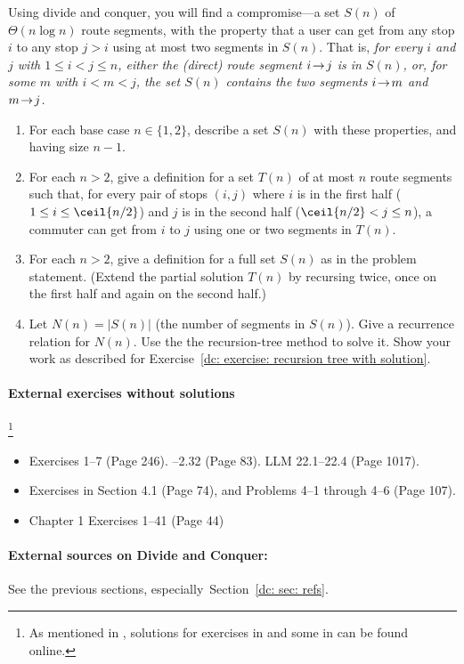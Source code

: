Using divide and conquer, you will find a compromise---a set $S(n)$ of $\Theta(n \log n)$ route segments, with the property that a user can get from any stop $i$ to any stop $j > i$ using at most two segments in $S(n)$.
That is, \emph{for every $i$ and $j$ with $1\le i< j\le n$, either the (direct) route segment $i\!\to\! j$ is in $S(n)$,
or, for some $m$ with $i<m<j$, the set $S(n)$ contains the two segments $i\!\to\! m$ and  $m\!\to\! j$.}

\begin{enumerate}[label=(\alph*)]
\item For each base case $n\in\{1,2\}$, describe a set $S(n)$ with these properties, and having size $n-1$.

\item For each $n>2$,
  give a definition for a set $T(n)$ of at most $n$ route segments such that,
  for every pair of stops $(i, j)$ where $i$ is in the first half ($1\le i \le \ceil{n/2}$)
  and $j$ is in the second half ($\ceil{n/2} < j \le n$),
  a commuter can get from $i$ to $j$
  using one or two segments in $T(n)$.

\item For each $n>2$, give a definition for a full set $S(n)$ as in the problem statement.
(Extend the partial solution $T(n)$ by recursing twice, once on the first half and again on the second half.)

\item Let $N(n) = |S(n)|$ (the number of segments in $S(n)$).
  Give a recurrence relation for $N(n)$.  Use the the recursion-tree method to solve it.
  Show your work as described for Exercise~\ref{dc: exercise: recursion tree with solution}.

\end{enumerate}


\paragraph{External exercises without solutions}\!\!\!\!\!\footnote
{As mentioned in , solutions for exercises in \KT and some in \CLRS can be found online.}

\begin{itemize}
\item \KT Exercises 1--7 (Page 246).  --2.32 (Page 83). LLM 22.1--22.4 (Page 1017).
\item \CLRS Exercises in Section 4.1 (Page 74), and Problems 4--1 through 4--6 (Page 107).
\item \JE Chapter 1 Exercises 1--41 (Page 44)
\end{itemize}
 
\paragraph{External sources on Divide and Conquer:} See the previous sections, especially~Section~\ref{dc: sec: refs}.

